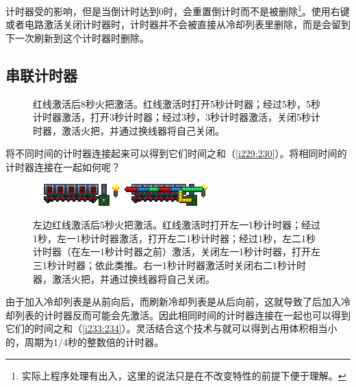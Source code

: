 计时器受的影响，但是当倒计时达到0时，会重置倒计时而不是被删除\footnote{实际上程序处理有出入，这里的说法只是在不改变特性的前提下便于理解。}。使用右键或者电路激活关闭计时器时，计时器并不会被直接从冷却列表里删除，而是会留到下一次刷新到这个计时器时删除。

\subsection{串联计时器}\label{sec20}
\begin{figure}[!ht]
\begin{center}
\qquad
{}
\end{center}
\caption{红线激活后8秒火把激活。红线激活时打开5秒计时器；经过5秒，5秒计时器激活，打开3秒计时器；经过3秒，3秒计时器激活，关闭5秒计时器，激活火把，并通过换线器将自己关闭。}
\label{i229:230}
\end{figure}
将不同时间的计时器连接起来可以得到它们时间之和（\autoref{i229:230}）。将相同时间的计时器连接在一起如何呢？

\begin{figure}[!ht]
\begin{center}
\includegraphics{images/233.png}\qquad\includegraphics{images/234.png}
\end{center}
\caption{左边红线激活后5秒火把激活。红线激活时打开左一1秒计时器；经过1秒，左一1秒计时器激活，打开左二1秒计时器；经过1秒，左二1秒计时器（在左一1秒计时器之前）激活，关闭左一1秒计时器，打开左三1秒计时器；依此类推。右一1秒计时器激活时关闭右二1秒计时器，激活火把，并通过换线器将自己关闭。}
\label{i233:234}
\end{figure}

由于加入冷却列表是从前向后，而刷新冷却列表是从后向前，这就导致了后加入冷却列表的计时器反而可能会先激活。因此相同时间的计时器连接在一起也可以得到它们的时间之和（\autoref{i233:234}）。灵活结合这个技术与就可以得到占用体积相当小的，周期为1/4秒的整数倍的计时器。

